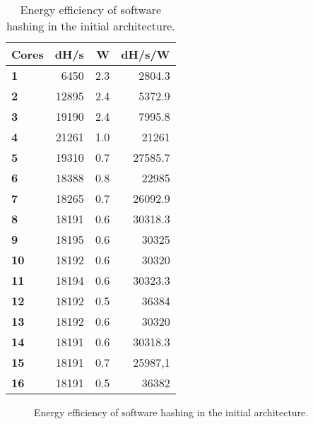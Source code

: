 \begin{appendix}
\begin{table}
\centering
\begin{tabular}{| l | r | r || r |}
  \hline 
  \textbf{Cores} & \textbf{dH/s} & \textbf{W} & \textbf{dH/s/W} \\
  \hline                       
  \textbf{1} &  6450 & 2.3 & 2804.3\\
  \textbf{2} &  12895 & 2.4 & 5372.9\\
  \textbf{3} &  19190 & 2.4 & 7995.8\\
  \textbf{4} &  21261 & 1.0 & 21261\\
  \textbf{5} &  19310 & 0.7 & 27585.7\\
  \textbf{6} &  18388 & 0.8 & 22985\\
  \textbf{7} &  18265 & 0.7 & 26092.9\\
  \textbf{8} &  18191 & 0.6 & 30318.3\\
  \textbf{9} &  18195 & 0.6 & 30325\\
  \textbf{10} &  18192 & 0.6 & 30320\\
  \textbf{11} &  18194 & 0.6 & 30323.3\\
  \textbf{12} &  18192 & 0.5 & 36384\\
  \textbf{13} &  18192 & 0.6 & 30320\\
  \textbf{14} &  18191 & 0.6 & 30318.3\\
  \textbf{15} &  18191 & 0.7 & 25987,1\\
  \textbf{16} &  18191 & 0.5 & 36382\\
  \hline 
\end{tabular}
\caption{Energy efficiency of software hashing in the initial architecture.}
\label{tab:SW-eff1}
\end{table}

\begin{figure}
\centering
	\caption{Energy efficiency of software hashing in the initial architecture.}
	\label{fig:SW-eff1}
\end{figure}


\end{appendix}
